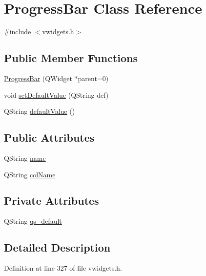 \hypertarget{classProgressBar}{
\section{ProgressBar Class Reference}
\label{classProgressBar}
}


{\ttfamily \#include $<$vwidgets.h$>$}

\subsection*{Public Member Functions}
\begin{DoxyCompactItemize}
\item 
\hyperlink{classProgressBar_a44d7c29cbad6f1823957d00cbad2464e}{ProgressBar} (QWidget $\ast$parent=0)
\item 
void \hyperlink{classProgressBar_a272a7bcfb45b986a8a171d8fefa402ee}{setDefaultValue} (QString def)
\item 
QString \hyperlink{classProgressBar_a8d2607aed0170c85af27fce5a4143a34}{defaultValue} ()
\end{DoxyCompactItemize}
\subsection*{Public Attributes}
\begin{DoxyCompactItemize}
\item 
QString \hyperlink{classProgressBar_af25531dd99ab1c50f0433322055a1756}{name}
\item 
QString \hyperlink{classProgressBar_a01f6641a949f427f14e9549e483225a1}{colName}
\end{DoxyCompactItemize}
\subsection*{Private Attributes}
\begin{DoxyCompactItemize}
\item 
QString \hyperlink{classProgressBar_a88c614233c1940b74d034073fe81b592}{qs\_\-default}
\end{DoxyCompactItemize}


\subsection{Detailed Description}


Definition at line 327 of file vwidgets.h.



